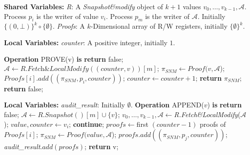 \documentclass[11pt]{article}
\theoremstyle{definition}
\begin{document}
\begin{algorithm}
\footnotesize %

    \caption{A wait-free implementation of \textit{ADL} with a single manager, a single auditor and $k$ provers using \textit{Snapshot\&modify}.}
    \label{alg:ADLUpperBound}
    \begin{algorithmic}[1]
    
    \Statex \textbf{Shared Variables:}
    \Statex \hspace{1em} \textit{R}: A \textit{Snapshot\&modify} object of $k+1$ values $v_0,\ldots,v_{k-1},\mathcal{A}$. Process $p_i$ is the writer of value $v_i$. Process $p_m$ is the writer of $\mathcal{A}$. Initially $\{(0, \bot)\}^{k}\circ\{\emptyset\}$.
    \Statex \hspace{1em} \textit{Proofs}:  A $k$-Dimensional array of R/W registers, initially $\{\emptyset\}^k$.

    
    \Statex
    \Statex \textbf{Local Variables:} \hfill {}
    \Statex \hspace{1em} \textit{counter}: A positive integer, initially $1$.
    
    \Statex
    \Statex \textbf{Operation} PROVE(v) \textbf{is}
    \State \textbf{return} false;
    \EndIf
    \State $\mathcal{A} \leftarrow \textit{R.Fetch\&LocalModify}((counter,v))[m]$;
    \State $\pi_{SNM} \leftarrow Proof(v,\mathcal{A}$);
    \State $Proofs[i].add((\pi_{SNM},p_i,counter))$;
    \State $counter\leftarrow counter+1$;
    \State \textbf{return} $\pi_{SNM}$;
    \Else
        \State \textbf{return} false;
    \EndIf

    \Statex
        \Statex \textbf{Local Variables:} \hfill {}
    \Statex \hspace{1em} \textit{audit\_result}: Initially  $\emptyset$.
    \Statex
    \Statex \textbf{Operation} APPEND($v$) \textbf{is} 
    \State \textbf{return} false;
    \EndIf
    \State $\mathcal{A}$$\leftarrow R.Snapshot()[m]\cup\{v\}$;
    \State $v_0,\ldots,v_{k-1},\mathcal{A}\leftarrow$\textit{R.Fetch\&LocalModify}($\mathcal{A}$);
    \State $value, counter\leftarrow v_i$;
    \State \textbf{continue};
    \EndIf
    \State $proofs\leftarrow$first $(counter-1)$ proofs of $Proofs[i]$;
    \State $\pi_{SNM} \leftarrow Proof(value,\mathcal{A}$);
    \State $proofs.add((\pi_{SNM},p_j,counter))$;
    \EndIf
    \State \textit{audit\_result}$.add(proofs)$;\hfill {}
    \EndFor 
    \State \textbf{return} v;


\end{algorithmic}
\end{algorithm}
\end{document}
